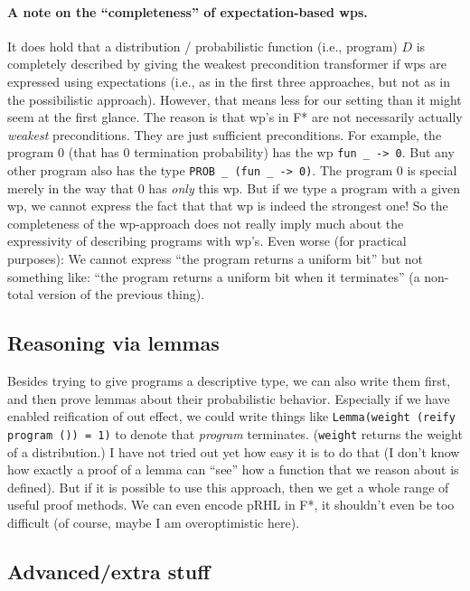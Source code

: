 \documentclass[a4paper]{article}
\begin{document}
\paragraph{A note on the ``completeness'' of expectation-based wps.}
It does hold that a distribution / probabilistic function (i.e.,
program) $D$ is completely described by giving the weakest
precondition transformer if wps are expressed using expectations (i.e., as in the first three approaches, but not as in the possibilistic approach).
However, that means less for our setting than it might seem at the first glance.
The reason is that wp's in F* are not necessarily actually \emph{weakest} preconditions.
They are just sufficient preconditions.
For example, the program $0$ (that has $0$ termination probability) has the wp \texttt{fun \_ -> 0}. But any other program also has the type \texttt{PROB \_ (fun \_ -> 0)}.
The program $0$ is special merely in the way that $0$ has \emph{only} this wp.
But if we type a program with a given wp, we cannot express the fact that that wp is indeed the strongest one!
So the completeness of the wp-approach does not really imply much about the expressivity of describing programs with wp's.
Even worse (for practical purposes): We cannot express ``the program returns a uniform bit'' but not something like: ``the program returns a uniform bit when it terminates'' (a non-total version of the previous thing).

\subsection{Reasoning via lemmas}

Besides trying to give programs a descriptive type, we can also write
them first, and then prove lemmas about their probabilistic
behavior. Especially if we have enabled reification of out effect, we
could write things like \texttt{Lemma(weight (reify program ()) = 1)}
to denote that \emph{program} terminates. (\texttt{weight} returns the
weight of a distribution.) I have not tried out yet how easy it is to
do that (I don't know how exactly a proof of a lemma can ``see'' how a
function that we reason about is defined). But if it is possible to
use this approach, then we get a whole range of useful proof
methods. We can even encode pRHL in F*, it shouldn't even be too
difficult (of course, maybe I am overoptimistic here).


\subsection{Advanced/extra stuff}
\end{document}
